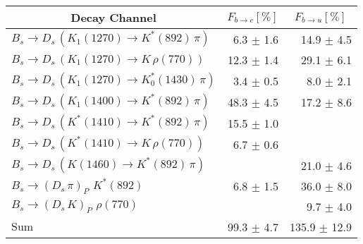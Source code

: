 \begin{tabular}{l r r } 
\hline
\hline
\multicolumn{1}{c}{Decay Channel} & \multicolumn{1}{c}{$F_{b \to c} [\%]$} & \multicolumn{1}{c}{$F_{b \to u} [\%]$}  \\ 
\hline
$B_s \to D_s \, ( K_1(1270) \to K^{*}(892) \, \pi )$ & 6.3 $\pm$ 1.6 & 14.9 $\pm$ 4.5 \\ 
$B_s \to D_s \, ( K_1(1270) \to K \, \rho(770) )$ & 12.3 $\pm$ 1.4 & 29.1 $\pm$ 6.1 \\ 
$B_s \to D_s \, ( K_1(1270) \to K^{*}_{0}(1430) \, \pi )$ & 3.4 $\pm$ 0.5 & 8.0 $\pm$ 2.1 \\ 
$B_s \to D_s \, ( K_1(1400) \to K^{*}(892) \, \pi )$ & 48.3 $\pm$ 4.5 & 17.2 $\pm$ 8.6 \\ 
$B_s \to D_s \, ( K^{*}(1410) \to K^{*}(892) \, \pi )$ & 15.5 $\pm$ 1.0 &  \\ 
$B_s \to D_s \, ( K^{*}(1410) \to K \, \rho(770) )$ & 6.7 $\pm$ 0.6 &  \\ 
$B_s \to D_s \, ( K(1460) \to K^{*}(892) \, \pi )$ &  & 21.0 $\pm$ 4.6 \\ 
$B_s \to ( D_s \, \pi)_{P} \, \, K^{*}(892)$ & 6.8 $\pm$ 1.5 & 36.0 $\pm$ 8.0 \\ 
$B_s \to ( D_s \, K)_{P} \, \, \rho(770)$ &  & 9.7 $\pm$ 4.0 \\ 
\hline
$\text{Sum}$ & 99.3 $\pm$ 4.7 & 135.9 $\pm$ 12.9 \\ 
\hline
\hline
\end{tabular}
